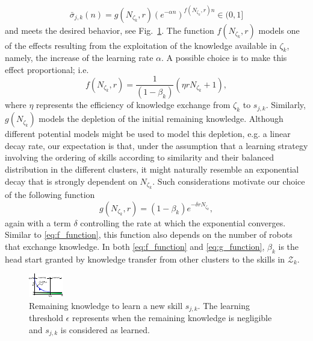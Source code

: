 \begin{equation}\label{eq:knowledge_exponential_form}
	\boxed{\bar{\sigma}_{j,k}(n) = g\left(N_{\zeta_k}, r\right) \left(e^{- \alpha  n}\right) ^{f\left(N_{\zeta_k}, r\right) n} \in (0,1]}
\end{equation}
and meets the desired behavior, see Fig.~\ref{fig:knowledge_idealization}. The function $f\left(N_{\zeta_k}, r\right)$ models one of the effects resulting from the exploitation of the knowledge available in $\zeta_k$, namely, the increase of the learning rate $\alpha$. A possible choice is to make this effect proportional; i.e.
\begin{equation}\label{eq:f_function}
	f\left(N_{\zeta_k},r\right) = \frac{1}{(1 - \beta_k)}\left( \eta r N_{\zeta_k} + 1 \right),
\end{equation}
where $\eta$ represents the efficiency of knowledge exchange from $\zeta_k$ to $s_{j,k}$. Similarly, $g\left(N_{\zeta_k}\right)$ models the depletion of the initial remaining knowledge. Although different potential models might be used to model this depletion, e.g. a linear decay rate, our expectation is that, under the assumption that a learning strategy involving the ordering of skills according to similarity and their balanced distribution in the different clusters, it might naturally resemble an exponential decay that is strongly dependent on $N_{\zeta_k}$. Such considerations motivate our choice of the following function
\begin{equation}\label{eq:g_function}
	g\left(N_{\zeta_k},r\right) = (1-\beta_k) e^{-\delta r N_{\zeta_k}},
\end{equation}
again with a term $\delta$ controlling the rate at which the exponential converges. Similar to \eqref{eq:f_function}, this function also depends on the number of robots that exchange knowledge. In both \eqref{eq:f_function} and \eqref{eq:g_function}, $\beta_k$ is the head start granted by knowledge transfer from other clusters to the skills in $\mathcal{Z}_k$.
\begin{figure}[!t]
	\centering
	\includegraphics[width=0.95\columnwidth]{fig/knowledge_idealization.pdf}
	\caption{Remaining knowledge to learn a new skill $s_{j,k}$. The learning threshold $\epsilon$ represents when the remaining knowledge is negligible and $s_{j,k}$ is considered as learned.}
	\label{fig:knowledge_idealization}
\end{figure}
